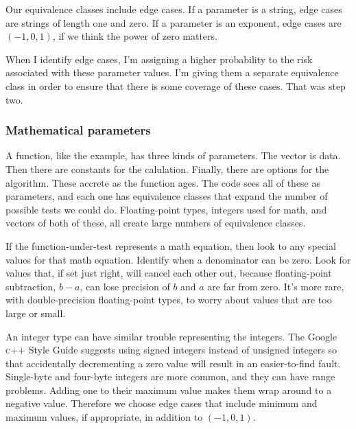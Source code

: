\documentclass[fleqn,10pt]{olplainarticle}
\newcommand{\cpp}{\textsc{c}++\xspace}
\begin{document}
Our equivalence classes include edge cases. If a parameter
is a string, edge cases are strings of length one and zero.
If a parameter is an exponent, edge cases are $(-1, 0, 1)$,
if we think the power of zero matters.

When I identify edge cases, I'm assigning a higher probability
to the risk associated with these parameter values. I'm
giving them a separate equivalence class in order to ensure
that there is some coverage of these cases. That was
step two.

\subsubsection{Mathematical parameters}

A function, like the example, has three kinds of parameters.
The vector is data. Then there are constants for the calulation.
Finally, there are options for the algorithm. These accrete
as the function ages. The code sees all of these as parameters,
and each one has equivalence classes that expand the
number of possible tests we could do.
Floating-point types, integers used for math, and vectors
of both of these, all create large numbers of equivalence classes.

If the function-under-test represents a math equation, then
look to any special values for that math equation. Identify
when a denominator can be zero. Look for values that,
if set just right, will cancel each other out, because
floating-point subtraction, $b-a$, can lose precision of
$b$ and $a$ are far from zero. It's more rare, with double-precision
floating-point types, to worry about values that are too
large or small.

An integer type can have similar trouble representing
the integers. The Google \cpp Style Guide suggests using
signed integers instead of unsigned integers so that
accidentally decrementing a zero value will result in an
easier-to-find fault. Single-byte and four-byte integers
are more common, and they can have range problems. Adding
one to their maximum value makes them wrap around to a
negative value. Therefore we choose edge cases that include
minimum and maximum values, if appropriate, in addition
to $(-1, 0, 1)$.
\end{document}

